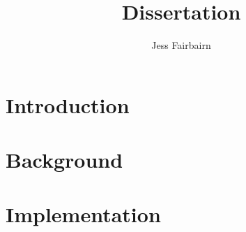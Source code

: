 \documentclass{article}
\author{Jess Fairbairn}
\title{Dissertation}
\begin{document}
        \maketitle
        \section{Introduction}

        \section{Background}
        
        
    
        \section{Implementation}
        
        

        
        
    
\end{document}

